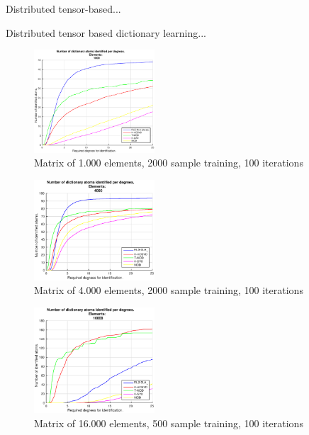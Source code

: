 \documentclass[conference]{IEEEtran}
\begin{document}
	Distributed tensor-based...

	Distributed tensor based dictionary learning...

\begin{figure}[!htb]
     \centering 
	 \includegraphics[width=0.4\textwidth]{figures/5_20_2000_1000_100.eps}
     \caption{Matrix of 1.000 elements, 2000 sample training, 100 iterations}
     \label{fig:facets_cross}
\end{figure}

\begin{figure}[!htb]
     \centering 
	 \includegraphics[width=0.4\textwidth]{figures/5_20_2000_4000_100.eps}
     \caption{Matrix of 4.000 elements, 2000 sample training, 100 iterations}
     \label{fig:facets_cross}
\end{figure}

\begin{figure}[!htb]
     \centering 
	 \includegraphics[width=0.4\textwidth]{figures/5_20_500_16000_100.eps}
     \caption{Matrix of 16.000 elements, 500 sample training, 100 iterations}
     \label{fig:facets_cross}
\end{figure}
\end{document}
